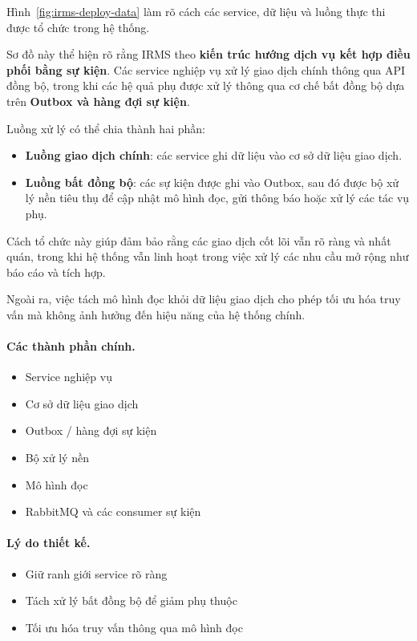 Hình~\ref{fig:irms-deploy-data} làm rõ cách các service, dữ liệu và luồng thực thi được tổ chức trong hệ thống.

Sơ đồ này thể hiện rõ rằng IRMS theo \textbf{kiến trúc hướng dịch vụ kết hợp điều phối bằng sự kiện}. Các service nghiệp vụ xử lý giao dịch chính thông qua API đồng bộ, trong khi các hệ quả phụ được xử lý thông qua cơ chế bất đồng bộ dựa trên \textbf{Outbox và hàng đợi sự kiện}.

Luồng xử lý có thể chia thành hai phần:

\begin{itemize}
  \item \textbf{Luồng giao dịch chính}: các service ghi dữ liệu vào cơ sở dữ liệu giao dịch.
  \item \textbf{Luồng bất đồng bộ}: các sự kiện được ghi vào Outbox, sau đó được bộ xử lý nền tiêu thụ để cập nhật mô hình đọc, gửi thông báo hoặc xử lý các tác vụ phụ.
\end{itemize}

Cách tổ chức này giúp đảm bảo rằng các giao dịch cốt lõi vẫn rõ ràng và nhất quán, trong khi hệ thống vẫn linh hoạt trong việc xử lý các nhu cầu mở rộng như báo cáo và tích hợp.

Ngoài ra, việc tách mô hình đọc khỏi dữ liệu giao dịch cho phép tối ưu hóa truy vấn mà không ảnh hưởng đến hiệu năng của hệ thống chính.

\paragraph{Các thành phần chính.}
\begin{itemize}
  \item Service nghiệp vụ
  \item Cơ sở dữ liệu giao dịch
  \item Outbox / hàng đợi sự kiện
  \item Bộ xử lý nền
  \item Mô hình đọc
  \item RabbitMQ và các consumer sự kiện
\end{itemize}

\paragraph{Lý do thiết kế.}
\begin{itemize}
  \item Giữ ranh giới service rõ ràng
  \item Tách xử lý bất đồng bộ để giảm phụ thuộc
  \item Tối ưu hóa truy vấn thông qua mô hình đọc
\end{itemize}

